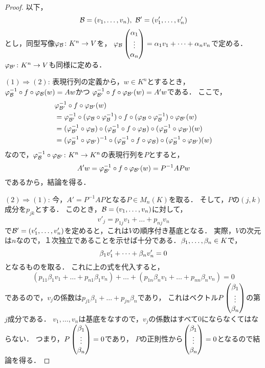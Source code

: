 \begin{proof}
    以下，
    \[
        \calB = (\idxdot{v}{1}{n}),\ \calB' = (\idxdot{v'}{1}{n})
    \]
    とし，同型写像$\varphi_\calB \colon K^n \to V$を，
    $\varphi_\calB \idxvec{\alpha}{1}{n} = \lncmb{\alpha}{v}{1}{n}{+}$で定める．
    $\varphi_{\calB'} \colon K^n \to V$も同様に定める．
    
    $(1) \Rightarrow (2)$:
    表現行列の定義から，$w \in K^n$とするとき，
    $\varphi_\calB^{-1} \circ f \circ \varphi_\calB(w) = Aw$かつ
    $\varphi_{\calB'}^{-1} \circ f \circ \varphi_{\calB'}(w) = A'w$である．
    ここで，
    \begin{equation}\label{eq:rel}
        \begin{split}
            &\varphi_{\calB'}^{-1} \circ f \circ \varphi_{\calB'}(w) \\
            &= \varphi_{\calB'}^{-1} \circ (\varphi_{\calB} \circ \varphi_{\calB}^{-1}) \circ f \circ (\varphi_{\calB} \circ \varphi_{\calB}^{-1}) \circ \varphi_{\calB'}(w) \\
            &= (\varphi_{\calB'}^{-1} \circ \varphi_{\calB}) \circ (\varphi_{\calB}^{-1} \circ f \circ \varphi_{\calB}) \circ (\varphi_{\calB}^{-1} \circ \varphi_{\calB'})(w) \\
            &= (\varphi_{\calB}^{-1} \circ \varphi_{\calB'})^{-1} \circ (\varphi_{\calB}^{-1} \circ f \circ \varphi_{\calB}) \circ (\varphi_{\calB}^{-1} \circ \varphi_{\calB'})(w)
        \end{split}
    \end{equation}
    なので，$\varphi_{\calB}^{-1} \circ \varphi_{\calB'} \colon K^n \to K^n$の表現行列を$P$とすると，
    \[
        A'w = \varphi_{\calB'}^{-1} \circ f \circ \varphi_{\calB'}(w) = P^{-1}APw
    \]
    であるから，結論を得る．
    
    $(2) \Rightarrow (1)$:
    今，$A'=P^{-1}AP$となる$P\in M_n(K)$を取る．
    そして，$P$の$(j,k)$成分を$p_{jk}$とする．
    このとき，$\calB=(\idxdot{v}{1}{n})$に対して，
    \begin{equation}\label{eq:rel_of_basis}
        v'_j = p_{1j}v_1 + \dots + p_{nj}v_n
    \end{equation}
    で$\calB' = (\idxdot{v'}{1}{n})$を定めると，これは$V$の順序付き基底となる．
    実際，$V$の次元は$n$なので，１次独立であることを示せば十分である．$\idxdot{\beta}{1}{n} \in K$で，
    \[
        \lncmb{\beta}{v'}{1}{n}{+} = 0
    \]
    となるものを取る．
    これに上の式を代入すると，
    \[
        (p_{11}\beta_1 v_1 + \dots + p_{n1}\beta_1 v_n) + \dots +  (p_{1n}\beta_n v_1 + \dots + p_{nn}\beta_n v_n) = 0
    \]
    であるので，$v_j$の係数は$p_{j1}\beta_1 + \dots + p_{jn}\beta_n$であり，
    これはベクトル$P\idxvec{\beta}{1}{n}$の第$j$成分である．
    $v_1,\dots,v_n$は基底をなすので，$v_j$の係数はすべて0にならなくてはならない．
    つまり，$P\idxvec{\beta}{1}{n} = 0$であり，
    $P$の正則性から$\idxvec{\beta}{1}{n} = 0$となるので結論を得る．
    

\end{proof}
